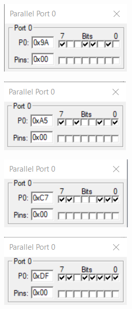 \documentclass{lab_sheet}
\begin{document}
\begin{figure}[H]
\begin{subfigure}{.5\textwidth}
  \centering
  \includegraphics[frame,width=.8\linewidth]{../Figures/1_6_f.png}  
  \label{fig:prob6a-f}
  \caption{}
\end{subfigure}
\begin{subfigure}{.5\textwidth}
  \centering
    \includegraphics[frame,width=.8\linewidth]{../Figures/1_6_g.png}  
  \label{fig:prob6a-g}
  \caption{}
\end{subfigure}
\begin{subfigure}{.5\textwidth}
  \centering
  \includegraphics[frame,width=.8\linewidth]{../Figures/1_6_h.png}   
  \caption{}
  \label{fig:prob6a-h}
\end{subfigure}
\begin{subfigure}{.5\textwidth}
  \centering
  \includegraphics[frame,width=.8\linewidth]{../Figures/1_6_i.png}   

\end{subfigure}
\end{figure}
\end{document}
